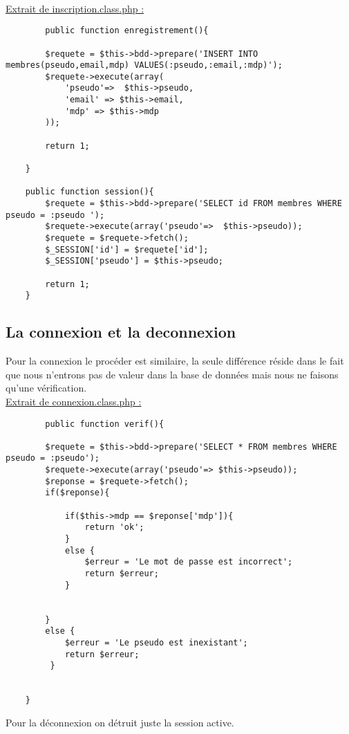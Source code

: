 \documentclass{article}
\begin{document}
    \\ \underline{Extrait de inscription.class.php :}
    \begin{lstlisting}
        public function enregistrement(){
        
        $requete = $this->bdd->prepare('INSERT INTO membres(pseudo,email,mdp) VALUES(:pseudo,:email,:mdp)');
        $requete->execute(array(
            'pseudo'=>  $this->pseudo,
            'email' => $this->email,
            'mdp' => $this->mdp 
        ));
        
        return 1; 
       
    }
    
    public function session(){
        $requete = $this->bdd->prepare('SELECT id FROM membres WHERE pseudo = :pseudo ');
        $requete->execute(array('pseudo'=>  $this->pseudo));
        $requete = $requete->fetch();
        $_SESSION['id'] = $requete['id'];
        $_SESSION['pseudo'] = $this->pseudo;
        
        return 1;
    }
    \end{lstlisting}
    \newpage
    \subsection{La connexion et la deconnexion}
    Pour la connexion le procéder est similaire, la seule différence réside dans le fait que nous n'entrons pas de valeur dans la base de données mais nous ne faisons qu'une vérification. \\
    \underline{Extrait de connexion.class.php :}
    \begin{lstlisting}
        public function verif(){
        
        $requete = $this->bdd->prepare('SELECT * FROM membres WHERE pseudo = :pseudo');
        $requete->execute(array('pseudo'=> $this->pseudo));
        $reponse = $requete->fetch();
        if($reponse){
            
            if($this->mdp == $reponse['mdp']){
                return 'ok';
            }
            else {
                $erreur = 'Le mot de passe est incorrect';
                return $erreur;
            }
            
            
        }
        else {
            $erreur = 'Le pseudo est inexistant';
            return $erreur;
         }
        
        
    }
    \end{lstlisting} 
    Pour la déconnexion on détruit juste la session active. 
    \newpage
\end{document}
